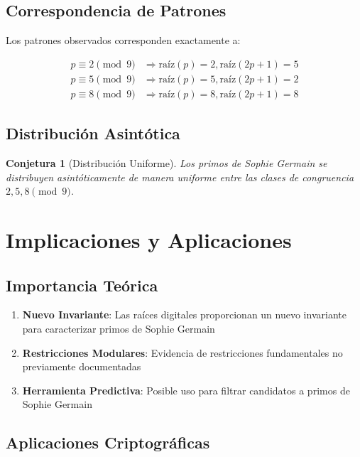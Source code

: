 \documentclass[11pt,a4paper]{article}
\newtheorem{conjecture}{Conjetura}
\theoremstyle{definition}
\theoremstyle{remark}
\begin{document}
\subsection{Correspondencia de Patrones}

Los patrones observados corresponden exactamente a:

\begin{align}
p \equiv 2 \pmod{9} &\Rightarrow \text{raíz}(p) = 2, \text{raíz}(2p+1) = 5 \\
p \equiv 5 \pmod{9} &\Rightarrow \text{raíz}(p) = 5, \text{raíz}(2p+1) = 2 \\
p \equiv 8 \pmod{9} &\Rightarrow \text{raíz}(p) = 8, \text{raíz}(2p+1) = 8
\end{align}

\subsection{Distribución Asintótica}

\begin{conjecture}[Distribución Uniforme]
Los primos de Sophie Germain se distribuyen asintóticamente de manera uniforme entre las clases de congruencia $2, 5, 8 \pmod{9}$.
\end{conjecture}

\section{Implicaciones y Aplicaciones}

\subsection{Importancia Teórica}

\begin{enumerate}
    \item \textbf{Nuevo Invariante}: Las raíces digitales proporcionan un nuevo invariante para caracterizar primos de Sophie Germain
    \item \textbf{Restricciones Modulares}: Evidencia de restricciones fundamentales no previamente documentadas
    \item \textbf{Herramienta Predictiva}: Posible uso para filtrar candidatos a primos de Sophie Germain
\end{enumerate}

\subsection{Aplicaciones Criptográficas}
\end{document}
